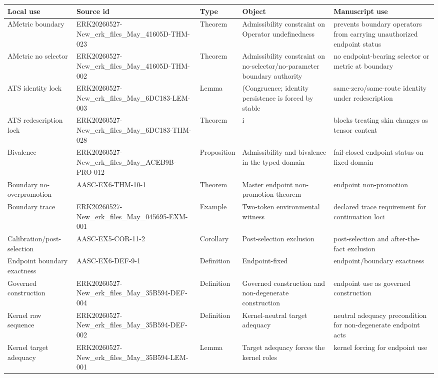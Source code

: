 \begin{longtable}{L{0.16\textwidth} L{0.20\textwidth} L{0.12\textwidth} L{0.21\textwidth} L{0.21\textwidth}}
\toprule
Local use & Source id & Type & Object & Manuscript use \\
\midrule
\endhead
AMetric boundary & ERK20260527-New\_erk\_files\_May\_41605D-THM-023 & Theorem & Admissibility constraint on Operator undefinedness & prevents boundary operators from carrying unauthorized endpoint status \\
AMetric no selector & ERK20260527-New\_erk\_files\_May\_41605D-THM-002 & Theorem & Admissibility constraint on no-selector/no-parameter boundary authority & no endpoint-bearing selector or metric at boundary \\
ATS identity lock & ERK20260527-New\_erk\_files\_May\_6DC183-LEM-003 & Lemma & (Congruence; identity persistence is forced by stable & same-zero/same-route identity under redescription \\
ATS redescription lock & ERK20260527-New\_erk\_files\_May\_6DC183-THM-028 & Theorem & i & blocks treating skin changes as tensor content \\
Bivalence & ERK20260527-New\_erk\_files\_May\_ACEB9B-PRO-012 & Proposition & Admissibility and bivalence in the typed domain & fail-closed endpoint status on fixed domain \\
Boundary no-overpromotion & AASC-EX6-THM-10-1 & Theorem & Master endpoint non-promotion theorem & endpoint non-promotion \\
Boundary trace & ERK20260527-New\_erk\_files\_May\_045695-EXM-001 & Example & Two-token environmental witness & declared trace requirement for continuation loci \\
Calibration/post-selection & AASC-EX5-COR-11-2 & Corollary & Post-selection exclusion & post-selection and after-the-fact exclusion \\
Endpoint boundary exactness & AASC-EX6-DEF-9-1 & Definition & Endpoint-fixed & endpoint/boundary exactness \\
Governed construction & ERK20260527-New\_erk\_files\_May\_35B594-DEF-004 & Definition & Governed construction and non-degenerate construction & endpoint use as governed construction \\
Kernel raw sequence & ERK20260527-New\_erk\_files\_May\_35B594-DEF-002 & Definition & Kernel-neutral target adequacy & neutral adequacy precondition for non-degenerate endpoint acts \\
Kernel target adequacy & ERK20260527-New\_erk\_files\_May\_35B594-LEM-001 & Lemma & Target adequacy forces the kernel roles & kernel forcing for endpoint use \\

\end{longtable}
